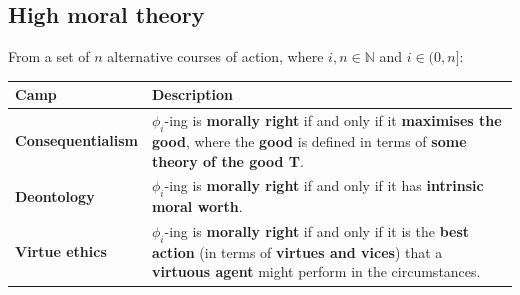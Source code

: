 \documentclass[11pt]{article}
\begin{document}
\subsection{High moral theory}
\label{sec:org9ff6320}
From a set of \(n\) alternative courses of action, where \(i, n \in \mathbb{N}\) and \(i \in (0, n]\):
\begin{center}
\begin{tabularx}{\textwidth}{|X|X|}
\hline
Camp & Description\\
\hline
\textbf{Consequentialism} & \(\phi_i\)-ing is \textbf{morally right} if and only if it \textbf{maximises the good}, where the \textbf{good} is defined in terms of \textbf{some theory of the good T}.\\
\hline
\textbf{Deontology} & \(\phi_i\)-ing is \textbf{morally right} if and only if it has \textbf{intrinsic moral worth}.\\
\hline
\textbf{Virtue ethics} & \(\phi_i\)-ing is \textbf{morally right} if and only if it is the \textbf{best action} (in terms of \textbf{virtues and vices}) that a \textbf{virtuous agent} might perform in the circumstances.\\
\hline
\end{tabularx}
\end{center}
 \newpage
\end{document}
